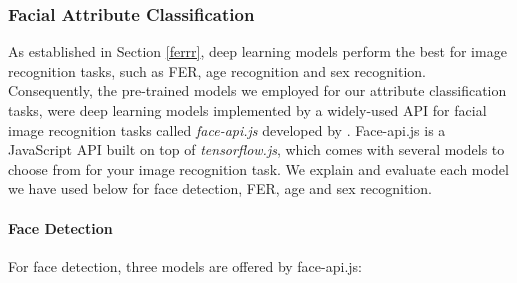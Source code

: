 \documentclass[12pt, a4paper]{article}
\begin{document}



\subsubsection{Facial Attribute Classification}

As established in Section \ref{ferrr}, deep learning models perform the best for image recognition tasks, such as FER, age recognition and sex recognition. Consequently, the pre-trained models we employed for our attribute classification tasks, were deep learning models implemented by a widely-used API for facial image recognition tasks called \textit{face-api.js} developed by \cite{faceapijs}. Face-api.js is a JavaScript API built on top of \textit{tensorflow.js}, which comes with several models to choose from for your image recognition task. We explain and evaluate each model we have used below for face detection, FER, age and sex recognition.

\paragraph{Face Detection}

For face detection, three models are offered by face-api.js:
\end{document}

